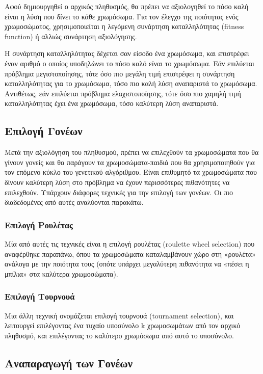 Αφού δημιουργηθεί ο αρχικός πληθυσμός, θα πρέπει να αξιολογηθεί το πόσο καλή είναι η λύση που δίνει το κάθε χρωμόσωμα. Για τον έλεγχο της ποιότητας ενός χρωμοσώματος, χρησιμοποιείται η λεγόμενη συνάρτηση καταλληλότητας (fitness function) ή αλλιώς συνάρτηση αξιολόγησης.

Η συνάρτηση καταλληλότητας δέχεται σαν είσοδο ένα χρωμόσωμα, και επιστρέφει έναν αριθμό ο οποίος υποδηλώνει το πόσο καλό είναι το χρωμόσωμα. Εάν επιλύεται πρόβλημα μεγιστοποίησης, τότε όσο πιο μεγάλη τιμή επιστρέφει η συνάρτηση καταλληλότητας για το χρωμόσωμα, τόσο πιο καλή λύση αναπαριστά το χρωμόσωμα. Αντιθέτως, εάν επιλύεται πρόβλημα ελαχιστοποίησης, τότε όσο πιο χαμηλή τιμή καταλληλότητας έχει ένα χρωμόσωμα, τόσο καλύτερη λύση αναπαριστά.

\subsection{Επιλογή Γονέων}

Μετά την αξιολόγηση του πληθυσμού, πρέπει να επιλεχθούν τα χρωμοσώματα που θα γίνουν γονείς και θα παράγουν τα χρωμοσώματα-παιδιά που θα χρησιμοποιηθούν για τον επόμενο κύκλο του γενετικού αλγόριθμου. Είναι επιθυμητό τα χρωμοσώματα που δίνουν καλύτερη λύση στο πρόβλημα να έχουν περισσότερες πιθανότητες να επιλεχθούν. Υπάρχουν διάφορες τεχνικές για την επιλογή των γονέων. Οι πιο διαδεδομένες από αυτές αναλύονται παρακάτω. 

\subsubsection{Επιλογή Ρουλέτας}

Μία από αυτές τις τεχνικές είναι η επιλογή ρουλέτας (roulette wheel selection) που αναφέρθηκε παραπάνω, όπου τα χρωμοσώματα καταλαμβάνουν χώρο στη «ρουλέτα» ανάλογα με την ποιότητα τους (οπότε υπάρχει μεγαλύτερη πιθανότητα να «πέσει η μπίλια» στα καλύτερα χρωμοσώματα).

\subsubsection{Επιλογή Τουρνουά}

Μια άλλη τεχνική ονομάζεται επιλογή τουρνουά (tournament selection), και λειτουργεί επιλέγοντας ένα τυχαίο υποσύνολο k χρωμοσωμάτων από τον αρχικό πληθυσμό, και επιλέγοντας το καλύτερο χρωμόσωμα από αυτό το υποσύνολο.

\subsection{Αναπαραγωγή των Γονέων}

